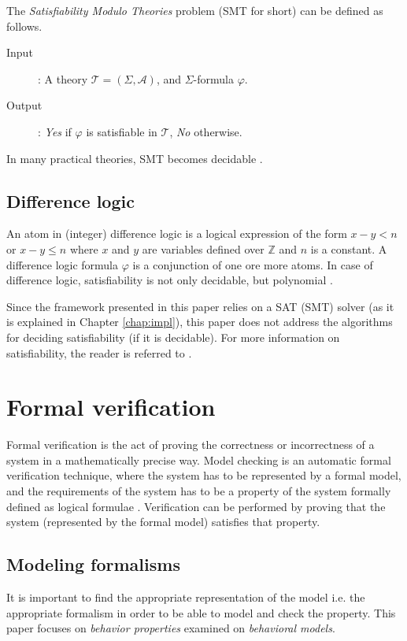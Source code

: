 The \emph{Satisfiability Modulo Theories} problem (SMT for short) can be defined as follows.
\begin{description}
	\item[Input]: A theory $\mathcal{T}=(\Sigma,\mathcal{A})$, and $\Sigma$-formula $\varphi$.
	\item[Output]: \emph{Yes} if $\varphi$ is satisfiable in $\mathcal{T}$, \emph{No} otherwise.
\end{description}

In many practical theories, SMT becomes decidable \cite{series/txtcs/KroeningS08}.

\subsection{Difference logic}

An atom in (integer) difference logic is a logical expression of the form $x-y<n$ or $x-y \leq n$ where $x$ and $y$ are variables defined over $\mathds{Z}$ and $n$ is a constant. A difference logic formula $\varphi$ is a conjunction of one ore more atoms. In case of difference logic, satisfiability is not only decidable, but polynomial \cite{series/txtcs/KroeningS08}.

Since the framework presented in this paper relies on a SAT (SMT) solver (as it is explained in Chapter \ref{chap:impl}), this paper does not address the algorithms for deciding satisfiability (if it is decidable). For more information on satisfiability, the reader is referred to \cite{books/daglib/0019162}.


\section{Formal verification}

Formal verification is the act of proving the correctness or incorrectness of a system in a mathematically precise way. Model checking is an automatic formal verification technique, where the system has to be represented by a formal model, and the requirements of the system has to be a property of the system formally defined as logical formulae \cite{clarke_em-etal:1999a}. Verification can be performed by proving that the system (represented by the formal model) satisfies that property.

\subsection{Modeling formalisms}
It is important to find the appropriate representation of the model i.e. the appropriate formalism in order to be able to model and check the property. This paper focuses on \emph{behavior properties} examined on \emph{behavioral models}. 

